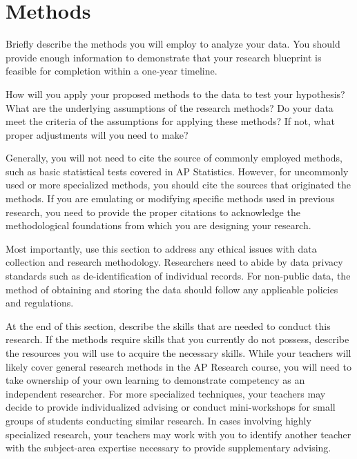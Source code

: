 \section{Methods}

Briefly describe the methods you will employ to analyze your data. You should provide enough information to demonstrate that your research blueprint is feasible for completion within a one-year timeline.

How will you apply your proposed methods to the data to test your hypothesis? What are the underlying assumptions of the research methods? Do your data meet the criteria of the assumptions for applying these methods? If not, what proper adjustments will you need to make?

Generally, you will not need to cite the source of commonly employed methods, such as basic statistical tests covered in AP Statistics. However, for uncommonly used or more specialized methods, you should cite the sources that originated the methods. If you are emulating or modifying specific methods used in previous research, you need to provide the proper citations to acknowledge the methodological foundations from which you are designing your research.

Most importantly, use this section to address any ethical issues with data collection and research methodology. Researchers need to abide by data privacy standards such as de-identification of individual records. For non-public data, the method of obtaining and storing the data should follow any applicable policies and regulations.

At the end of this section, describe the skills that are needed to conduct this research. If the methods require skills that you currently do not possess, describe the resources you will use to acquire the necessary skills. While your teachers will likely cover general research methods in the AP Research course, you will need to take ownership of your own learning to demonstrate competency as an independent researcher. For more specialized techniques, your teachers may decide to provide individualized advising or conduct mini-workshops for small groups of students conducting similar research. In cases involving highly specialized research, your teachers may work with you to identify another teacher with the subject-area expertise necessary to provide supplementary advising.  

 

